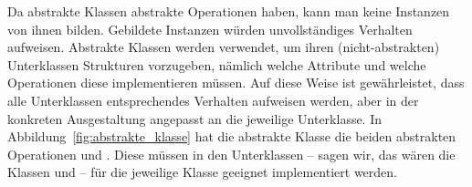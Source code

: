 Da abstrakte Klassen abstrakte Operationen haben, kann man keine Instanzen von ihnen bilden. Gebildete Instanzen würden unvollständiges Verhalten auf\-weisen. \mbox{Abstrakte} Klassen werden verwendet, um ihren (nicht-abstrakten) Unter\-klassen Strukturen vorzugeben, nämlich welche Attribute und welche Operationen diese implementieren müssen. Auf diese Weise ist gewährleistet, dass alle Unterklassen entsprechendes Verhalten aufweisen werden, aber in der konkreten Ausgestaltung angepasst an die jeweilige Unterklasse. In Abbildung~\ref{fig:abstrakte_klasse} hat die abstrakte Klasse  die beiden abstrakten Operationen  und . Diese müssen in den Unterklassen -- sagen wir, das wären die Klassen  und  -- für die jeweilige Klasse geeignet implementiert werden. 